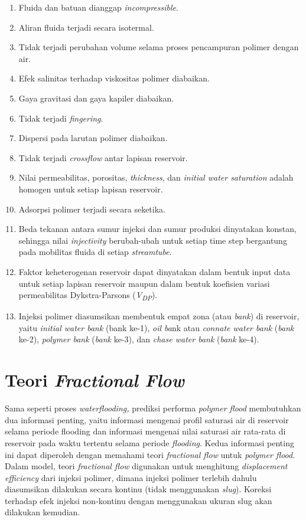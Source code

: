 \documentclass[
]{book}
\providecommand{\tightlist}{%
  \setlength{\itemsep}{0pt}\setlength{\parskip}{0pt}}
\begin{document}
\begin{enumerate}
\def\labelenumi{\alph{enumi}.}
\tightlist
\item
  Fluida dan batuan dianggap \emph{incompressible}.
\item
  Aliran fluida terjadi secara isotermal.
\item
  Tidak terjadi perubahan volume selama proses pencampuran polimer dengan air.
\item
  Efek salinitas terhadap viskositas polimer diabaikan.
\item
  Gaya gravitasi dan gaya kapiler diabaikan.
\item
  Tidak terjadi \emph{fingering}.
\item
  Dispersi pada larutan polimer diabaikan.
\item
  Tidak terjadi \emph{crossflow} antar lapisan reservoir.
\item
  Nilai permeabilitas, porositas, \emph{thickness}, dan \emph{initial water saturation} adalah homogen untuk setiap lapisan reservoir.
\item
  Adsorpsi polimer terjadi secara seketika.
\item
  Beda tekanan antara sumur injeksi dan sumur produksi dinyatakan konstan, sehingga nilai \emph{injectivity} berubah-ubah untuk setiap time step bergantung pada mobilitas fluida di setiap \emph{streamtube}.
\item
  Faktor keheterogenan reservoir dapat dinyatakan dalam bentuk input data untuk setiap lapisan reservoir maupun dalam bentuk koefisien variasi permeabilitas Dykstra-Parsons (\emph{V\textsubscript{DP}}).
\item
  Injeksi polimer diasumsikan membentuk empat zona (atau \emph{bank}) di reservoir, yaitu \emph{initial water bank} (bank ke-1), \emph{oil ba}nk atau \emph{connate water bank} (\emph{bank} ke-2), \emph{polymer bank} (\emph{bank} ke-3), dan \emph{chase water bank} (\emph{bank} ke-4).
\end{enumerate}

\hypertarget{teori-fractional-flow}{%
\section{\texorpdfstring{Teori \emph{Fractional Flow}}{Teori Fractional Flow}}\label{teori-fractional-flow}}

Sama seperti proses \emph{waterflooding,} prediksi performa \emph{polymer flood} membutuhkan dua informasi penting, yaitu informasi mengenai profil saturasi air di reservoir selama periode flooding dan informasi mengenai nilai saturasi air rata-rata di reservoir pada waktu tertentu selama periode \emph{flooding}. Kedua informasi penting ini dapat diperoleh dengan memahami teori \emph{fractional flow} untuk \emph{polymer flood}. Dalam model, teori \emph{fractional flow} digunakan untuk menghitung \emph{displacement efficiency} dari injeksi polimer, dimana injeksi polimer terlebih dahulu diasumsikan dilakukan secara kontinu (tidak menggunakan \emph{slug}). Koreksi terhadap efek injeksi non-kontinu dengan menggunakan ukuran slug akan dilakukan kemudian.
\end{document}
